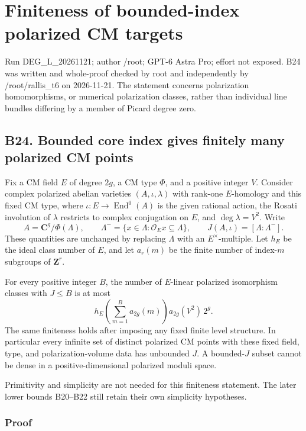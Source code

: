 \documentclass[11pt,a4paper]{article}
\theoremstyle{definition}
\begin{document}
\section{Finiteness of bounded-index polarized CM targets}

Run DEG\_L\_20261121; author /root; GPT-6 Astra Pro; effort not exposed.
B24 was written and whole-proof checked by root and independently by
/root/rallis\_t6 on 2026-11-21. The statement concerns polarization
homomorphisms, or numerical polarization classes, rather than individual
line bundles differing by a member of Picard degree zero.

\subsection{B24. Bounded core index gives finitely many polarized CM
points}\label{bounded-core-moduli-b24.-bounded-core-index-gives-finitely-many-polarized-cm-points}

Fix a CM field \(E\) of degree \(2g\), a CM type \(\Phi\), and a
positive integer \(V\). Consider complex polarized abelian varieties
\((A,\iota,\lambda)\) with rank-one \(E\)-homology and this fixed CM
type, where \(\iota:E\to\operatorname{End}^0(A)\) is the given rational
action, the Rosati involution of \(\lambda\) restricts to complex
conjugation on \(E\), and \(\deg\lambda=V^2\). Write \[
 A=\mathbf C^g/\Phi(\Lambda),\qquad
 \Lambda^- =\{x\in\Lambda:\mathcal O_E x\subseteq\Lambda\},
 \qquad J(A,\iota)=[\Lambda:\Lambda^-].
 \tag{B24.1}
\] These quantities are unchanged by replacing \(\Lambda\) with an
\(E^\times\)-multiple. Let \(h_E\) be the ideal class number of \(E\),
and let \(a_r(m)\) be the finite number of index-\(m\) subgroups of
\(\mathbf Z^r\).

For every positive integer \(B\), the number of \(E\)-linear polarized
isomorphism classes with \(J\le B\) is at most \[
 h_E\left(\sum_{m=1}^B a_{2g}(m)\right)
       a_{2g}(V^2)\,2^g.
 \tag{B24.2}
\] The same finiteness holds after imposing any fixed finite level
structure. In particular every infinite set of distinct polarized CM
points with these fixed field, type, and polarization-volume data has
unbounded \(J\). A bounded-\(J\) subset cannot be dense in a
positive-dimensional polarized moduli space.

Primitivity and simplicity are not needed for this finiteness statement.
The later lower bounds B20--B22 still retain their own simplicity
hypotheses.

\subsubsection{Proof}\label{bounded-core-moduli-proof}
\end{document}
